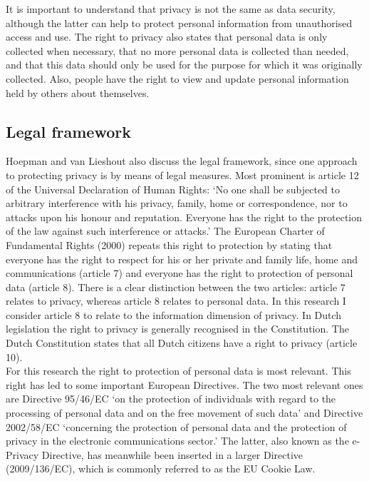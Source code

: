 It is important to understand that privacy is not the same as data security, although the latter can help to protect personal information from unauthorised access and use. The right to privacy also states that personal data is only collected when necessary, that no more personal data is collected than needed, and that this data should only be used for the purpose for which it was originally collected. Also, people have the right to view and update personal information held by others about themselves.
	
\subsection{Legal framework}
Hoepman and van Lieshout \cite{privacy} also discuss the legal framework, since one approach to protecting privacy is by means of legal measures. Most prominent is article 12 of the Universal Declaration of Human Rights: `No one shall be subjected to arbitrary interference with his privacy, family, home or correspondence, nor to attacks upon his honour and reputation. Everyone has the right to the protection of the law against such interference or attacks.' The European Charter of Fundamental Rights (2000) repeats this right to protection by stating that everyone has the right to respect for his or her private and family life, home and communications (article 7) and everyone has the right to protection of personal data (article 8). There is a clear distinction between the two articles: article 7 relates to privacy, whereas article 8 relates to personal data. In this research I consider article 8 to relate to the information dimension of privacy. In Dutch legislation the right to privacy is generally recognised in the Constitution. The Dutch Constitution states that all Dutch citizens have a right to privacy (article 10). \\

For this research the right to protection of personal data is most relevant. This right has led to some important European Directives. The two most relevant ones are Directive 95/46/EC \cite{epat1995directive} `on the protection of individuals with regard to the processing of personal data and on the free movement of such data' and Directive 2002/58/EC \cite{parliamentdirective} `concerning the protection of personal data and the protection of privacy in the electronic communications sector.' The latter, also known as the e-Privacy Directive, has meanwhile been inserted in a larger Directive (2009/136/EC), which is commonly referred to as the EU Cookie Law.\\

